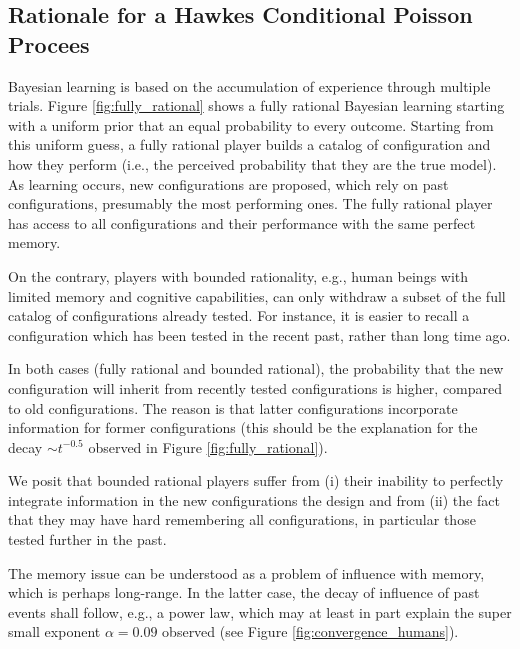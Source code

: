 \subsection*{Rationale for a Hawkes Conditional Poisson Procees}
Bayesian learning is based on the accumulation of experience through multiple trials. Figure \ref{fig:fully_rational} shows a fully rational Bayesian learning starting with a uniform prior that an equal probability to every outcome. Starting from this uniform guess, a fully rational player builds a catalog of configuration and how they perform (i.e., the perceived probability that they are the true model). As learning occurs, new configurations are proposed, which rely on past configurations, presumably the most performing ones. The fully rational player has access to all configurations and their performance with the same perfect memory. 

On the contrary, players with bounded rationality, e.g., human beings with limited memory and cognitive capabilities, can only withdraw a subset of the full catalog of configurations already tested. For instance, it is easier to recall a configuration which has been tested in the recent past, rather than long time ago.

In both cases (fully rational and bounded rational), the probability that the new configuration will inherit from recently tested configurations is higher, compared to old configurations. The reason is that latter configurations incorporate information for former configurations (this should be the explanation for the decay $\sim t^{-0.5}$ observed in Figure \ref{fig:fully_rational}). 

We posit that bounded rational players suffer from (i) their inability to perfectly integrate information in the new configurations the design and from (ii) the fact that they may have hard remembering all configurations, in particular those tested further in the past.

The memory issue can be understood as a problem of influence with memory, which is perhaps long-range. In the latter case, the decay of influence of past events shall follow, e.g., a power law, which may at least in part explain the super small exponent $\alpha = 0.09$ observed (see Figure \ref{fig:convergence_humans}).

